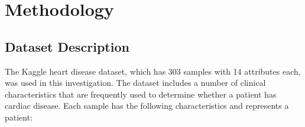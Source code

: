 \chapter{Methodology}
\label{ch:method} %


\section{Dataset Description}

The Kaggle heart disease dataset\cite{lapp-heart-disease-dataset-1988}, which has 303 samples with 14 attributes each, was used in this investigation. The dataset includes a number of clinical characteristics that are frequently used to determine whether a patient has cardiac disease. Each sample has the following characteristics and represents a patient:

